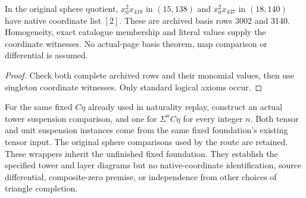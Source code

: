 \begin{lemma}
  \label{lem:lin-high-stem-native-coordinates}
  \leanok
  In the original sphere quotient, $x_0^2x_{418}$ in $(15,138)$
  and $x_0^2x_{437}$ in $(18,140)$ have native coordinate list $[2]$.
  These are archived basis rows 3002 and 3140. Homogeneity, exact
  catalogue membership and literal values supply the coordinate witnesses.
  No actual-page basis theorem, map comparison or differential is assumed.
\end{lemma}
\begin{proof}
  \leanok
  Check both complete archived rows and their monomial values, then use
  singleton coordinate witnesses. Only standard logical axioms occur.
\end{proof}

\begin{proposition}
  \label{prop:lin-ceta-tower-suspension}
  \notready
  For the same fixed $C\eta$ already used in naturality replay, construct
  an actual tower suspension comparison, and one for $\Sigma^nC\eta$
  for every integer $n$. Both tensor and unit suspension instances come
  from the same fixed foundation's existing tensor input. The original
  sphere comparisons used by the route are retained.
  These wrappers inherit the unfinished fixed foundation. They establish
  the specified tower and layer diagrams but no native-coordinate
  identification, source differential, composite-zero premise, or
  independence from other choices of triangle completion.
\end{proposition}

